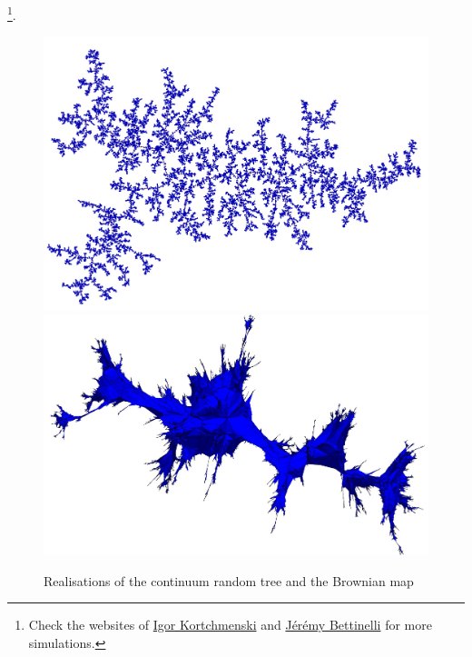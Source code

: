 \footnote{Check the websites of \href{https://igor-kortchemski.perso.math.cnrs.fr/images.html}{Igor Kortchmenski} and \href{http://www.normalesup.org/~bettinel/simul.html}{J\'er\'emy Bettinelli} for more simulations.}.
\begin{figure}[h]
	\begin{center}
		\includegraphics[scale=0.3]{CRT.jpg}
		\includegraphics[scale=1.7]{BrownianMap.jpg}
		\caption*{Realisations of the continuum random tree and the Brownian map}
	\end{center}
\end{figure}

